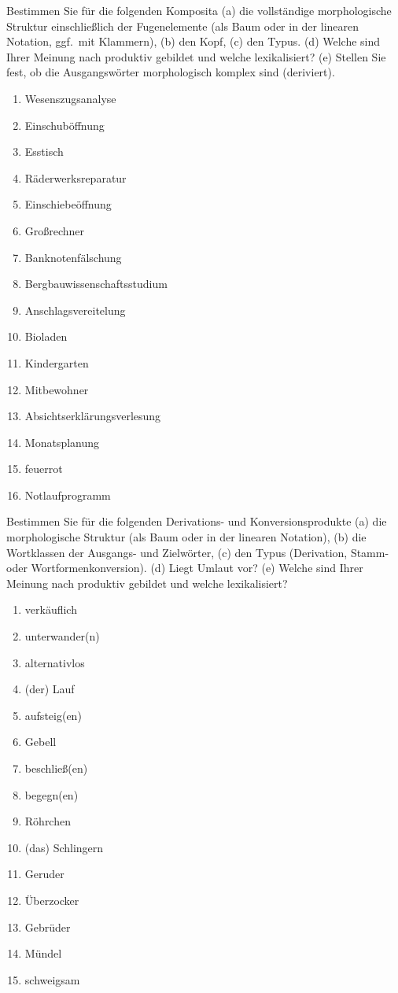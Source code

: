 \Uebungen

\Uebung \label{u71} Bestimmen Sie für die folgenden Komposita (a) die vollständige morphologische Struktur einschließlich der Fugenelemente (als Baum oder in der linearen Notation, ggf.\ mit Klammern), (b) den Kopf, (c) den Typus. (d) Welche sind Ihrer Meinung nach produktiv gebildet und welche lexikalisiert? (e) Stellen Sie fest, ob die Ausgangswörter morphologisch komplex sind (\zB deriviert).

\begin{enumerate}\Lf
  \item Wesenszugsanalyse
  \item Einschuböffnung
  \item Esstisch
  \item Räderwerksreparatur
  \item Einschiebeöffnung
  \item Großrechner
  \item Banknotenfälschung
  \item Bergbauwissenschaftsstudium
  \item Anschlagsvereitelung
  \item Bioladen
  \item Kindergarten
  \item Mitbewohner
  \item Absichtserklärungsverlesung
  \item Monatsplanung
  \item feuerrot
  \item Notlaufprogramm
\end{enumerate}

\Uebung \label{u72} Bestimmen Sie für die folgenden Derivations- und Konversionsprodukte (a) die morphologische Struktur (als Baum oder in der linearen Notation), (b) die Wortklassen der Ausgangs- und Zielwörter, (c) den Typus (Derivation, Stamm- oder Wortformenkonversion). (d) Liegt Umlaut vor? (e) Welche sind Ihrer Meinung nach produktiv gebildet und welche lexikalisiert? 

\begin{enumerate}\Lf
  \item verkäuflich
  \item unterwander(n)
  \item alternativlos
  \item (der) Lauf
  \item aufsteig(en)
  \item Gebell
  \item beschließ(en)
  \item begegn(en)
  \item Röhrchen
  \item (das) Schlingern
  \item Geruder
  \item Überzocker
  \item Gebrüder
  \item Mündel
  \item schweigsam
\end{enumerate}

